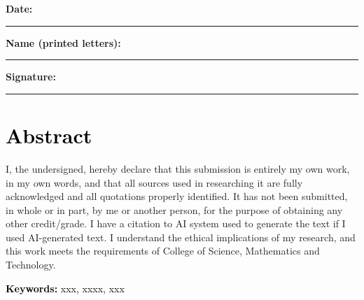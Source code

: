 \documentclass[a4paper,12pt]{article}
\begin{document}
\bigskip
\bigskip
\bigskip
\bigskip
\bigskip
\bigskip

\begin{minipage}{0.9\textwidth} 
\raggedright %
\textbf{Date:} \rule[-8pt]{11.5cm}{0.1em}

\bigskip
\textbf{Name (printed letters):} \rule[-8pt]{7.8cm}{0.1em}

\bigskip
\textbf{Signature:} \rule[-8pt]{10.55cm}{0.1em}

\end{minipage}


\clearpage
\bigskip

\section[Abstract]{\textbf{\textcolor{black}{Abstract}}\textbf{\textcolor{black}{ }}}
\begin{flushleft} \justifying  I, the undersigned, hereby declare that this submission is entirely my own work, in my own words, and that all sources used in researching it are fully acknowledged and all quotations properly identified. It has not been submitted, in whole or in part, by me or another person, for the purpose of obtaining any other credit/grade. I have a citation to AI system used to generate the text if I used AI-generated text. I understand the ethical implications of my research, and this work meets the requirements of College of Science, Mathematics and Technology.
\end{flushleft}





\bigskip
\begin{flushleft} 

\textbf{\textcolor{black}{Keywords:}}
\textcolor{black}{xxx, xxxx, xxx}


\end{flushleft}

\clearpage

\setcounter{tocdepth}{3}
\tableofcontents



\clearpage\section[List of Figures]{}
\listoffigures



\clearpage\section[List of Tables]{}
\listoftables
\end{document}

